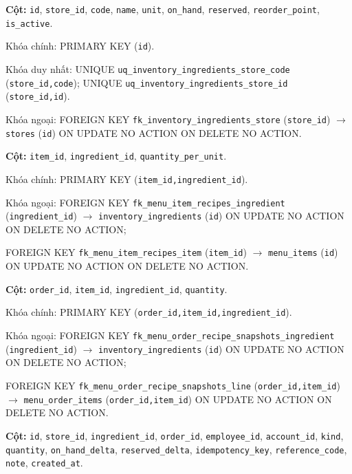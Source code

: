 \begin{description}[leftmargin=3.6cm,labelwidth=3.4cm,style=nextline]

\item[\texttt{inventory\_ingredients}] \textbf{Cột:} \texttt{id}, \texttt{store\_id}, \texttt{code}, \texttt{name}, \texttt{unit}, \texttt{on\_hand}, \texttt{reserved}, \texttt{reorder\_point}, \texttt{is\_active}.

Khóa chính: PRIMARY KEY (\texttt{id}).

Khóa duy nhất: UNIQUE \texttt{uq\_inventory\_ingredients\_store\_code} (\texttt{store\_id,code}); UNIQUE \texttt{uq\_inventory\_ingredients\_store\_id} (\texttt{store\_id,id}).

Khóa ngoại: FOREIGN KEY \texttt{fk\_inventory\_ingredients\_store} (\texttt{store\_id}) $\rightarrow$ \texttt{stores} (\texttt{id}) ON UPDATE NO ACTION ON DELETE NO ACTION.

\item[\texttt{menu\_item\_recipes}] \textbf{Cột:} \texttt{item\_id}, \texttt{ingredient\_id}, \texttt{quantity\_per\_unit}.

Khóa chính: PRIMARY KEY (\texttt{item\_id,ingredient\_id}).

Khóa ngoại: FOREIGN KEY \texttt{fk\_menu\_item\_recipes\_ingredient} (\texttt{ingredient\_id}) $\rightarrow$ \texttt{inventory\_ingredients} (\texttt{id}) ON UPDATE NO ACTION ON DELETE NO ACTION;\par FOREIGN KEY \texttt{fk\_menu\_item\_recipes\_item} (\texttt{item\_id}) $\rightarrow$ \texttt{menu\_items} (\texttt{id}) ON UPDATE NO ACTION ON DELETE NO ACTION.

\item[\texttt{menu\_order\_recipe\_snapshots}] \textbf{Cột:} \texttt{order\_id}, \texttt{item\_id}, \texttt{ingredient\_id}, \texttt{quantity}.

Khóa chính: PRIMARY KEY (\texttt{order\_id,item\_id,ingredient\_id}).

Khóa ngoại: FOREIGN KEY \texttt{fk\_menu\_order\_recipe\_snapshots\_ingredient} (\texttt{ingredient\_id}) $\rightarrow$ \texttt{inventory\_ingredients} (\texttt{id}) ON UPDATE NO ACTION ON DELETE NO ACTION;\par FOREIGN KEY \texttt{fk\_menu\_order\_recipe\_snapshots\_line} (\texttt{order\_id,item\_id}) $\rightarrow$ \texttt{menu\_order\_items} (\texttt{order\_id,item\_id}) ON UPDATE NO ACTION ON DELETE NO ACTION.

\item[\texttt{inventory\_movements}] \textbf{Cột:} \texttt{id}, \texttt{store\_id}, \texttt{ingredient\_id}, \texttt{order\_id}, \texttt{employee\_id}, \texttt{account\_id}, \texttt{kind}, \texttt{quantity}, \texttt{on\_hand\_delta}, \texttt{reserved\_delta}, \texttt{idempotency\_key}, \texttt{reference\_code}, \texttt{note}, \texttt{created\_at}.


\end{description}
